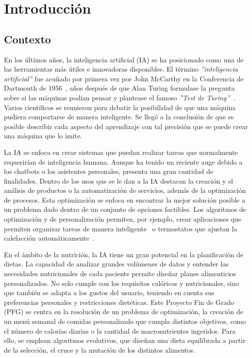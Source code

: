 \chapter{Introducción}
\label{ch:introduccion}

\section{Contexto}
En los últimos años, la inteligencia artificial (IA) se ha posicionado como una de las herramientas más útiles e innovadoras disponibles. El término \textit{''inteligencia artificial''} fue acuñado por primera vez por John McCarthy en la Conferencia de Dartmouth de 1956~\cite{dartmouth1956}, años después de que Alan Turing formulase la pregunta sobre si las máquinas podían pensar y plantease el famoso \textit{''Test de Turing''}~\cite{turing1950}. Varios científicos se reunieron para debatir la posibilidad de que una máquina pudiera comportarse de manera inteligente. Se llegó a la conclusión de que es posible describir cada aspecto del aprendizaje con tal precisión que se puede crear una máquina que lo imite.

La IA se enfoca en crear sistemas que puedan realizar tareas que normalmente requerirían de inteligencia humana. Aunque ha tenido un reciente auge debido a los chatbots o los asistentes personales, presenta una gran cantidad de finalidades. Dentro de los usos que se le dan a la IA destacan la creación y el análisis de productos o la automatización de servicios, además de la optimización de procesos. Esta optimización se enfoca en encontrar la mejor solución posible a un problema dado dentro de un conjunto de opciones factibles. Los algoritmos de optimización y de personalización permiten, por ejemplo, crear aplicaciones que permiten organizar tareas de manera inteligente~\cite{todoist2024} o termostatos que ajustan la calefacción automáticamente~\cite{googlenest2020}.

En el ámbito de la nutrición, la IA tiene un gran potencial en la planificación de dietas. La capacidad de analizar grandes volúmenes de datos y entender las necesidades nutricionales de cada paciente permite diseñar planes alimenticios personalizados. No solo cumple con los requisitos calóricos y nutricionales, sino que también se adapta a los gustos del usuario, teniendo en cuenta sus preferencias personales y restricciones dietéticas.
\newpage
Este Proyecto Fin de Grado (PFG) se centra en la resolución de un problema de optimización, la creación de un menú semanal de comidas personalizado que cumpla distintos objetivos, como el número de calorías diarias o la cantidad de macronutrientes ingeridos. Para ello, se emplean algoritmos evolutivos, que diseñan una dieta equilibrada a partir de la selección, el cruce y la mutación de los distintos alimentos.


